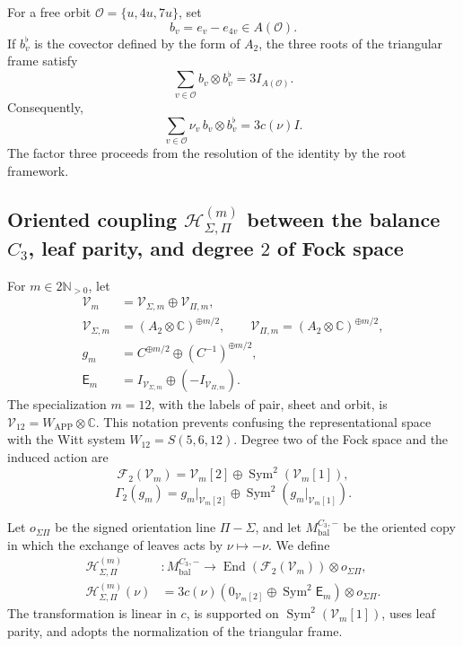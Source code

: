 For a free orbit
\(\mathcal O=\{u,4u,7u\}\), set
\[
b_v=e_v-e_{4v}\in A(\mathcal O).
\]
If \(b_v^\flat\) is the covector defined by the form of \(A_2\), the three
roots of the triangular frame satisfy
\[
\boxed{
\sum_{v\in\mathcal O}b_v\otimes b_v^\flat
=3I_{A(\mathcal O)}.}
\]
Consequently,
\[
\sum_{v\in\mathcal O}\nu_v\,b_v\otimes b_v^\flat
=3c(\nu)I.
\]
The factor three proceeds from the resolution of the identity by the root framework.

\subsection{Oriented coupling \(\mathcal H_{\Sigma,\Pi}^{(m)}\) between the balance \(C_3\), leaf parity, and degree \(2\) of Fock space}

For \(m\in2\mathbb N_{>0}\), let
\[
\begin{aligned}
\mathcal V_m&=\mathcal V_{\Sigma,m}\oplus\mathcal V_{\Pi,m},\\
\mathcal V_{\Sigma,m}&=(A_2\otimes\mathbb C)^{\oplus m/2},\qquad
\mathcal V_{\Pi,m}=(A_2\otimes\mathbb C)^{\oplus m/2},\\
g_m&=C^{\oplus m/2}\oplus(C^{-1})^{\oplus m/2},\\
\mathsf E_m&=I_{\mathcal V_{\Sigma,m}}
\oplus(-I_{\mathcal V_{\Pi,m}}).
\end{aligned}
\]
The specialization \(m=12\), with the labels of pair, sheet and orbit,
is \(\mathcal V_{12}=W_{\mathrm{APP}}\otimes\mathbb C\). This notation
prevents confusing the representational space with the Witt system
\(W_{12}=S(5,6,12)\). Degree two of the Fock space and the induced action are
\[
\mathcal F_2(\mathcal V_m)
=\mathcal V_m[2]\oplus\operatorname{Sym}^2(\mathcal V_m[1]),
\]
\[
\Gamma_2(g_m)
=g_m|_{\mathcal V_m[2]}
\oplus\operatorname{Sym}^2(g_m|_{\mathcal V_m[1]}).
\]

Let \(o_{\Sigma\Pi}\) be the signed orientation line
\(\Pi-\Sigma\), and let \(M_{\mathrm{bal}}^{C_3,-}\) be the oriented copy in
which the exchange of leaves acts by \(\nu\mapsto-\nu\). We define
\[
\boxed{
\begin{aligned}
\mathcal H_{\Sigma,\Pi}^{(m)}&:
M_{\mathrm{bal}}^{C_3,-}\longrightarrow
\operatorname{End}(\mathcal F_2(\mathcal V_m))\otimes o_{\Sigma\Pi},\\
\mathcal H_{\Sigma,\Pi}^{(m)}(\nu)
&=3c(\nu)
\left(0_{\mathcal V_m[2]}\oplus\operatorname{Sym}^2\mathsf E_m\right)
\otimes o_{\Sigma\Pi}.
\end{aligned}}
\]
The transformation is linear in \(c\), is supported on
\(\operatorname{Sym}^2(\mathcal V_m[1])\), uses leaf parity, and adopts the
normalization of the triangular frame.

